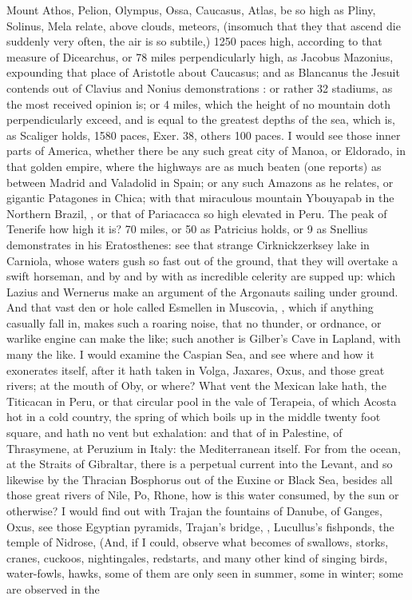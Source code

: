 {Mount Athos, Pelion, Olympus, Ossa, Caucasus, Atlas, be so high as Pliny, Solinus, Mela relate, above clouds, meteors,  (insomuch that they that ascend die suddenly very often, the air is so subtile,) 1250 paces high, according to that measure of Dicearchus, or 78 miles perpendicularly high, as Jacobus Mazonius,  expounding that place of Aristotle about Caucasus; and as Blancanus the Jesuit contends out of Clavius and Nonius demonstrations : or rather 32 stadiums, as the most received opinion is; or 4 miles, which the height of no mountain doth perpendicularly exceed, and is equal to the greatest depths of the sea, which is, as Scaliger holds, 1580 paces, Exer. 38, others 100 paces. I would see those inner parts of America, whether there be any such great city of Manoa, or Eldorado, in that golden empire, where the highways are as much beaten (one reports) as between Madrid and Valadolid in Spain; or any such Amazons as he relates, or gigantic Patagones in Chica; with that miraculous mountain Ybouyapab in the Northern Brazil, , \etc{} or that of Pariacacca so high elevated in Peru. The peak of Tenerife how high it is? 70 miles, or 50 as Patricius holds, or 9 as Snellius demonstrates in his Eratosthenes: see that strange Cirknickzerksey lake in Carniola, whose waters gush so fast out of the ground, that they will overtake a swift horseman, and by and by with as incredible celerity are supped up: which Lazius and Wernerus make an argument of the Argonauts sailing under ground. And that vast den or hole called Esmellen in Muscovia, , \etc{} which if anything casually fall in, makes such a roaring noise, that no thunder, or ordnance, or warlike engine can make the like; such another is Gilber's Cave in Lapland, with many the like. I would examine the Caspian Sea, and see where and how it exonerates itself, after it hath taken in Volga, Jaxares, Oxus, and those great rivers; at the mouth of Oby, or where? What vent the Mexican lake hath, the Titicacan in Peru, or that circular pool in the vale of Terapeia, of which Acosta  hot in a cold country, the spring of which boils up in the middle twenty foot square, and hath no vent but exhalation: and that of  in Palestine, of Thrasymene, at Peruzium in Italy: the Mediterranean itself. For from the ocean, at the Straits of Gibraltar, there is a perpetual current into the Levant, and so likewise by the Thracian Bosphorus out of the Euxine or Black Sea, besides all those great rivers of Nile, Po, Rhone, \etc{} how is this water consumed, by the sun or otherwise? I would find out with Trajan the fountains of Danube, of Ganges, Oxus, see those Egyptian pyramids, Trajan's bridge, , Lucullus's fishponds, the temple of Nidrose, \etc{} (And, if I could, observe what becomes of swallows, storks, cranes, cuckoos, nightingales, redstarts, and many other kind of singing birds, water-fowls, hawks, \etc{} some of them are only seen in summer, some in winter; some are observed in the }
